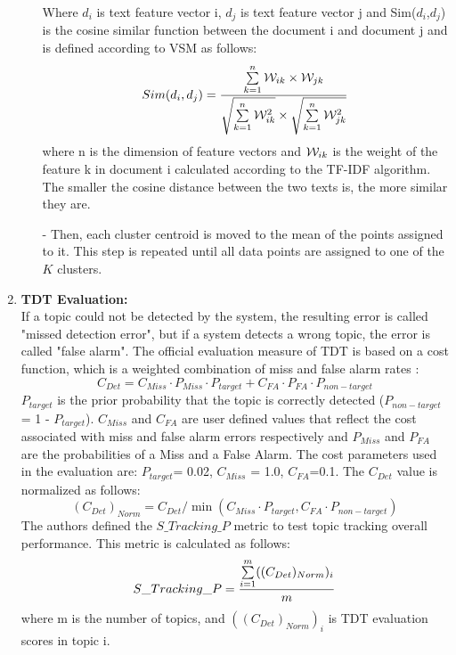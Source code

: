 \begin{enumerate}
\begin{itemize}
	Where $d_i$ is text feature vector i, $d_j$ is text feature vector j and Sim($d_{i}$,$d_{j}$) is the cosine similar function between the document i and document j and is defined according to VSM as follows:
		\begin{equation}
 			Sim(d_{i},d_{j})={\sum\limits_{k=1}^{n}{\cal W}_{ik}\times {\cal W}_{jk}\over\sqrt{\sum\limits_{k=1}^{n}{\cal W}_{ik}^{2}}\times\sqrt{\sum\limits_{k=1}^{n}{\cal W}_{jk}^{2}}}
		\end{equation}
where n is the dimension of feature vectors and ${\cal W}_{ik}$ is the weight of the feature k in document i calculated according to the TF-IDF algorithm.  The smaller the cosine distance between the two texts is, the more similar they are.	
\item [-] Then, each cluster centroid is moved to the mean of the points assigned to it.
This step is repeated until all data points are assigned to one of the $K$ clusters.
\end{itemize}
		\item \textbf{TDT Evaluation:\\}
		If a topic could not be detected by the system, the resulting error is called "missed detection error", but if a system detects a wrong topic, the error is called "false alarm"\cite{a:tdtmetric}. The official evaluation measure of TDT is based on a cost function, which is a weighted combination of miss and false alarm rates \cite{a:tdtmetric}:
	\begin{equation}
C_{Det} = C_{Miss}\cdot P_{Miss}\cdot P_{target} + C_{FA}\cdot P_{FA}\cdot P_{non-target} 
	\end{equation}
$P_{target}$ is the prior probability that the topic is correctly detected ($P_{non-target}$ = 1 - $P_{target}$). $C_{Miss}$ and $C_{FA}$ are user defined  values that reflect the cost associated with miss and false alarm errors respectively and $P_{Miss}$ and $P_{FA}$ are the probabilities of a Miss and a False Alarm.
The cost parameters used in the evaluation are:  $P_{target}$= 0.02, $C_{Miss}$ = 1.0, $C_{FA}$=0.1.
The $C_{Det}$ value is normalized as follows:
	\begin{equation}
			(C_{Det})_{Norm} = C_{Det}/\min(C_{Miss}\cdot P_{target}, C_{FA}\cdot P_{non-target})
	\end{equation}	
The authors defined the $S{\_}Tracking{\_}P$ metric to test topic tracking overall performance. This metric is calculated as follows:
			\begin{equation}
	S{\_}Tracking{\_}P={\sum\limits_{i=1}^{m}((C_{Det})_{Norm})_{i} \over m}
			\end{equation}
	where m is the number of topics, and $((C_{Det})_{Norm})_{i}$ is TDT evaluation scores in topic i.
	\end{enumerate}  	  
	  
